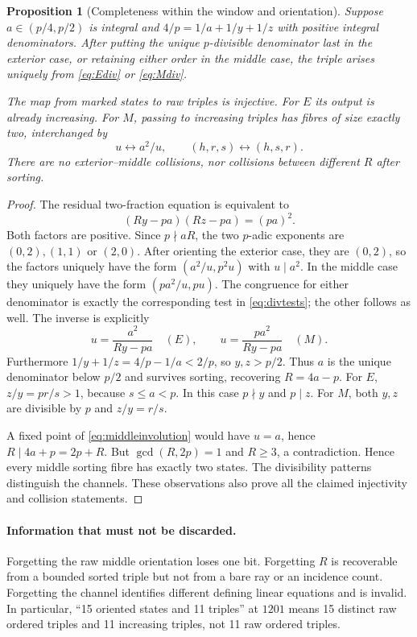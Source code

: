 \documentclass[11pt]{article}
\newtheorem{proposition}[theorem]{Proposition}
\theoremstyle{remark}\newtheorem{remark}[theorem]{Remark}
\begin{document}
\begin{proposition}[Completeness within the window and orientation]\label{prop:orientation}
Suppose $a\in(p/4,p/2)$ is integral and
$4/p=1/a+1/y+1/z$ with positive integral denominators. After putting the unique $p$-divisible denominator last in the exterior case, or retaining either order in the middle case, the triple arises uniquely from \eqref{eq:Ediv} or \eqref{eq:Mdiv}.

The map from marked states to raw triples is injective. For $E$ its output is already increasing. For $M$, passing to increasing triples has fibres of size exactly two, interchanged by
\begin{equation}\label{eq:middleinvolution}
 u\longleftrightarrow a^2/u,\qquad (h,r,s)\longleftrightarrow(h,s,r).
\end{equation}
There are no exterior--middle collisions, nor collisions between different $R$ after sorting.
\end{proposition}
\begin{proof}
The residual two-fraction equation is equivalent to
\begin{equation}\label{eq:factorpair}
 (Ry-pa)(Rz-pa)=(pa)^2.
\end{equation}
Both factors are positive. Since $p\nmid aR$, the two $p$-adic exponents are $(0,2),(1,1)$ or $(2,0)$. After orienting the exterior case, they are $(0,2)$, so the factors uniquely have the form $(a^2/u,p^2u)$ with $u\mid a^2$. In the middle case they uniquely have the form $(pa^2/u,pu)$. The congruence for either denominator is exactly the corresponding test in \eqref{eq:divtests}; the other follows as well. The inverse is explicitly
\[
 u=\frac{a^2}{Ry-pa}\quad(E),\qquad
 u=\frac{pa^2}{Ry-pa}\quad(M).
\]
Furthermore $1/y+1/z=4/p-1/a<2/p$, so $y,z>p/2$. Thus $a$ is the unique denominator below $p/2$ and survives sorting, recovering $R=4a-p$. For $E$, $z/y=pr/s>1$, because $s\le a<p$. In this case $p\nmid y$ and $p\mid z$. For $M$, both $y,z$ are divisible by $p$ and $z/y=r/s$.

A fixed point of \eqref{eq:middleinvolution} would have $u=a$, hence $R\mid4a+p=2p+R$. But $\gcd(R,2p)=1$ and $R\ge3$, a contradiction. Hence every middle sorting fibre has exactly two states. The divisibility patterns distinguish the channels. These observations also prove all the claimed injectivity and collision statements.
\end{proof}

\paragraph{Information that must not be discarded.}
Forgetting the raw middle orientation loses one bit. Forgetting $R$ is recoverable from a bounded sorted triple but not from a bare ray or an incidence count. Forgetting the channel identifies different defining linear equations and is invalid. In particular, ``15 oriented states and 11 triples'' at $1201$ means 15 distinct raw ordered triples and 11 increasing triples, not 11 raw ordered triples.
\end{document}
